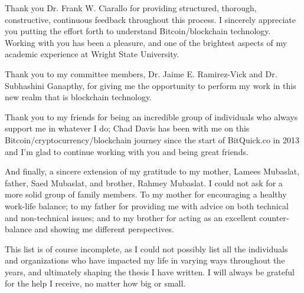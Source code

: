 \documentclass[12pt]{report}
\begin{document}
Thank you Dr. Frank W. Ciarallo for providing structured, thorough, constructive, continuous feedback throughout this process. I sincerely appreciate you putting the effort forth to understand Bitcoin/blockchain technology. Working with you has been a pleasure, and one of the brightest aspects of my academic experience at Wright State University.

\setlength{\parindent}{2em}
Thank you to my committee members, Dr. Jaime E. Ramirez-Vick and Dr. Subhashini Ganapthy, for giving me the opportunity to perform my work in this new realm that is blockchain technology.

Thank you to my friends for being an incredible group of individuals who always support me in whatever I do; Chad Davis has been with me on this Bitcoin/cryptocurrency/blockchain journey since the start of BitQuick.co in 2013 and I'm glad to continue working with you and being great friends.

And finally, a sincere extension of my gratitude to my mother, Lamees Mubaslat, father, Saed Mubaslat, and brother, Rahmey Mubaslat. I could not ask for a more solid group of family members. To my mother for encouraging a healthy work-life balance; to my father for providing me with advice on both technical and non-technical issues; and to my brother for acting as an excellent counter-balance and showing me different perspectives.

This list is of course incomplete, as I could not possibly list all the individuals and organizations who have impacted my life in varying ways throughout the years, and ultimately shaping the thesis I have written. I will always be grateful for the help I receive, no matter how big or small.

%
\begin{comment}
\newpage
\thispagestyle{plain}
\vspace*{3in}
\begin{center}
Dedicated to\\
Somebody special (Wife, husband, girlfriend or boyfriend works well
here.)
\end{center}
\end{comment}
%
%
%
\newpage
\setcounter{page}{1}
\setlength{\parindent}{2em}
\end{document}
